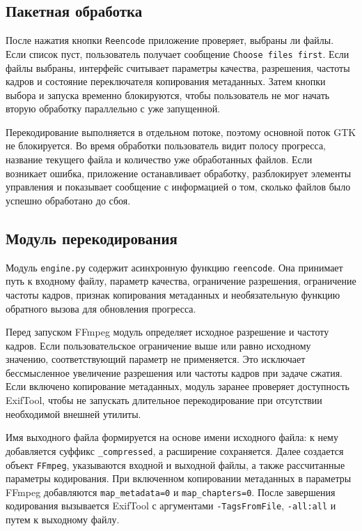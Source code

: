 \documentclass[14pt,a4paper]{extarticle}
\begin{document}
\subsection{Пакетная обработка}

После нажатия кнопки \texttt{Reencode} приложение проверяет, выбраны ли файлы. Если список пуст, пользователь получает сообщение \texttt{Choose files first}. Если файлы выбраны, интерфейс считывает параметры качества, разрешения, частоты кадров и состояние переключателя копирования метаданных. Затем кнопки выбора и запуска временно блокируются, чтобы пользователь не мог начать вторую обработку параллельно с уже запущенной.

Перекодирование выполняется в отдельном потоке, поэтому основной поток GTK не блокируется. Во время обработки пользователь видит полосу прогресса, название текущего файла и количество уже обработанных файлов. Если возникает ошибка, приложение останавливает обработку, разблокирует элементы управления и показывает сообщение с информацией о том, сколько файлов было успешно обработано до сбоя.

\subsection{Модуль перекодирования}

Модуль \texttt{engine.py} содержит асинхронную функцию \texttt{reencode}. Она принимает путь к входному файлу, параметр качества, ограничение разрешения, ограничение частоты кадров, признак копирования метаданных и необязательную функцию обратного вызова для обновления прогресса.

Перед запуском FFmpeg модуль определяет исходное разрешение и частоту кадров. Если пользовательское ограничение выше или равно исходному значению, соответствующий параметр не применяется. Это исключает бессмысленное увеличение разрешения или частоты кадров при задаче сжатия. Если включено копирование метаданных, модуль заранее проверяет доступность ExifTool, чтобы не запускать длительное перекодирование при отсутствии необходимой внешней утилиты.

Имя выходного файла формируется на основе имени исходного файла: к нему добавляется суффикс \texttt{\_compressed}, а расширение сохраняется. Далее создается объект \texttt{FFmpeg}, указываются входной и выходной файлы, а также рассчитанные параметры кодирования. При включенном копировании метаданных в параметры FFmpeg добавляются \texttt{map\_metadata=0} и \texttt{map\_chapters=0}. После завершения кодирования вызывается ExifTool с аргументами \texttt{-TagsFromFile}, \texttt{-all:all} и путем к выходному файлу.
\end{document}
